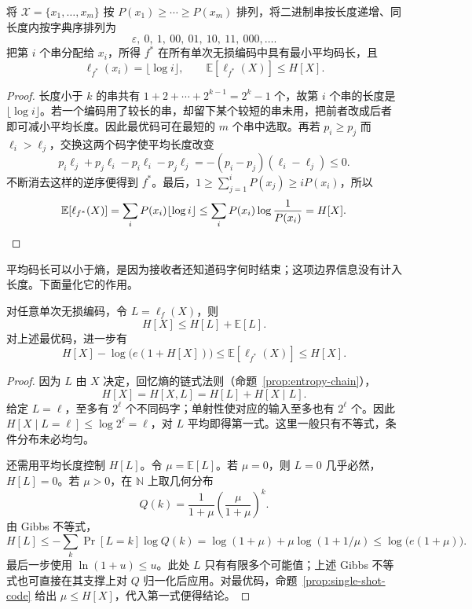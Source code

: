 \documentclass[lang=cn,a4paper,fontset=none,zihao=false,10pt,openany,twoside]{beautybook}
\numberwithin{algorithm}{chapter}
\newcommand{\N}{\mathbb N}
\begin{document}
\begin{proposition}[按概率排序的单次最优码]\label{prop:single-shot-code}
将 $\mathcal X=\{x_1,\ldots,x_m\}$ 按 $P(x_1)\ge\cdots\ge P(x_m)$ 排列，将二进制串按长度递增、同长度内按字典序排列为
\[
 \varepsilon,\ 0,\ 1,\ 00,\ 01,\ 10,\ 11,\ 000,\ldots.
\]
把第 $i$ 个串分配给 $x_i$，所得 $f^*$ 在所有单次无损编码中具有最小平均码长，且
\[
 \ell_{f^*}(x_i)=\lfloor\log i\rfloor,\qquad
 \mathbb E[\ell_{f^*}(X)]\le H[X].
\]
\end{proposition}
\begin{proof}
长度小于 $k$ 的串共有 $1+2+\cdots+2^{k-1}=2^k-1$ 个，故第 $i$ 个串的长度是 $\lfloor\log i\rfloor$。若一个编码用了较长的串，却留下某个较短的串未用，把前者改成后者即可减小平均长度。因此最优码可在最短的 $m$ 个串中选取。再若 $p_i\ge p_j$ 而 $\ell_i>\ell_j$，交换这两个码字使平均长度改变
\[
 p_i\ell_j+p_j\ell_i-p_i\ell_i-p_j\ell_j
 =-(p_i-p_j)(\ell_i-\ell_j)\le0.
\]
不断消去这样的逆序便得到 $f^*$。最后，$1\ge\sum_{j=1}^iP(x_j)\ge iP(x_i)$，所以
\[
 \mathbb E[\ell_{f^*}(X)]
 =\sum_iP(x_i)\lfloor\log i\rfloor
 \le\sum_iP(x_i)\log\frac1{P(x_i)}=H[X].\qedhere
\]
\end{proof}
平均码长可以小于熵，是因为接收者还知道码字何时结束；这项边界信息没有计入长度。下面量化它的作用。
\begin{proposition}[长度本身携带的信息]\label{prop:length-entropy}
对任意单次无损编码，令 $L=\ell_f(X)$，则
\[
 H[X]\le H[L]+\mathbb E[L].
\]
对上述最优码，进一步有
\[
 H[X]-\log\bigl(e(1+H[X])\bigr)
 \le\mathbb E[\ell_{f^*}(X)]\le H[X].
\]
\end{proposition}
\begin{proof}
因为 $L$ 由 $X$ 决定，回忆熵的链式法则（命题~\ref{prop:entropy-chain}），
\[
 H[X]=H[X,L]=H[L]+H[X\mid L].
\]
给定 $L=\ell$，至多有 $2^\ell$ 个不同码字；单射性使对应的输入至多也有 $2^\ell$ 个。因此 $H[X\mid L=\ell]\le\log 2^\ell=\ell$，对 $L$ 平均即得第一式。这里一般只有不等式，条件分布未必均匀。

还需用平均长度控制 $H[L]$。令 $\mu=\mathbb E[L]$。若 $\mu=0$，则 $L=0$ 几乎必然，$H[L]=0$。若 $\mu>0$，在 $\N$ 上取几何分布
\[
 Q(k)=\frac1{1+\mu}\left(\frac{\mu}{1+\mu}\right)^k.
\]
由 Gibbs 不等式，
\[
 H[L]\le-\sum_k\Pr[L=k]\log Q(k)
 =\log(1+\mu)+\mu\log(1+1/\mu)
 \le\log\bigl(e(1+\mu)\bigr).
\]
最后一步使用 $\ln(1+u)\le u$。此处 $L$ 只有有限多个可能值；上述 Gibbs 不等式也可直接在其支撑上对 $Q$ 归一化后应用。对最优码，命题~\ref{prop:single-shot-code} 给出 $\mu\le H[X]$，代入第一式便得结论。
\end{proof}
\end{document}
